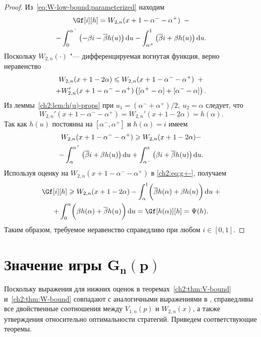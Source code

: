 {\begin{proof}
  Из~\eqref{eq:W-low-bound:parameterized} находим
  \begin{multline}\label{ch2:eq:g+-}
    \Gf[i][h] = W_{2,n}(x + 1 - \alpha^- - \alpha^+) \enskip - \\
    - \int_0^{\alpha^-} \left(-\Co i - \DCo h(u)\right) \di u -
    \int_{\alpha^+}^1 \left(\DCo i + \Co h(u)\right) \di u.
  \end{multline}
  Поскольку $W_{2,n}(\cdot)$ "--- дифференцируемая вогнутая функция, верно неравенство
  \begin{multline*}
    W_{2,n}(x + 1 - 2\alpha) \leqslant W_{2,n}(x + 1 - \alpha^- - \alpha^+) \enskip +\\
    + W_{2,n}'(x + 1 - \alpha^- - \alpha^+) \left( [ \alpha^+ - \alpha ] + [
      \alpha^- - \alpha ] \right).
  \end{multline*}
  Из леммы~\ref{ch2:lem:h(u)-props} при $u_1 = (\alpha^- + \alpha^+)/2,\: u_2 = \alpha$ следует, что
  \[
    W_{2,n}'(x + 1 - \alpha^- - \alpha^+) = W_{2,n}'(x + 1 - 2\alpha) =
    h(\alpha).
  \]
  Так как $h(u)$ постоянна на $[\alpha^-, \alpha^+]$ и $h(\alpha) = i$ имеем
  \begin{multline*}
    W_{2,n}(x + 1 - \alpha^- - \alpha^+) \geqslant W_{2,n}(x + 1 - 2\alpha) - \\
    - \int_\alpha^{\alpha^+} \left( {\overline{\beta}} i + \beta h(u) \right) \mathop{}\!\mathrm{d} u +
    \int_{\alpha^-}^\alpha \left( \beta i + {\overline{\beta}} h(u) \right) \mathop{}\!\mathrm{d} u.
  \end{multline*}
  Используя оценку на $W_{2,n}(x + 1 - \alpha^- - \alpha^+)$ в \eqref{ch2:eq:g+-}, получаем
  \begin{multline*}
    \Gf[i][h] \geqslant W_{2,n}(x + 1 - 2\alpha)
    - \int_\alpha^1 \biggl( \DCo h(\alpha) + \Co h(u) \biggr) \di u \; + \\
    + \int_0^\alpha \biggl( \Co h(\alpha) + \DCo h(u) \biggr) \di u =
    \Gf[h(\alpha)][h] = \Psi(h).
  \end{multline*}
  Таким образом, требуемое неравенство справедливо при любом $i \in [0, 1]$.
\end{proof}

\section{Значение игры $\mathbf{G_n\left(p\right)}$}
\label{ch2:sec:game-value}

Поскольку выражения для нижних оценок в теоремах~\ref{ch2:thm:V-bound} и~\ref{ch2:thm:W-bound} совпадают с аналогичными выражениями в \cite{demeyer02}, справедливы все двойственные соотношения между $V_{1,n}(p)$ и $W_{2,n}(x)$, а также утверждения относительно оптимальности стратегий.
Приведем соответствующие теоремы.

}
